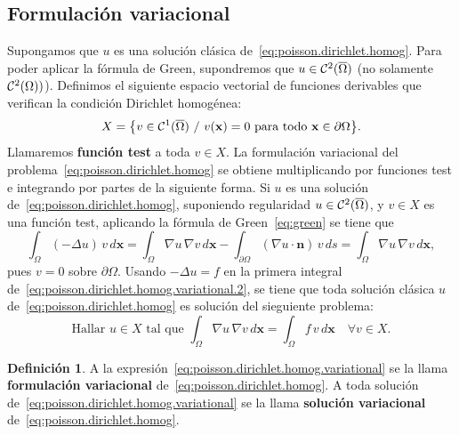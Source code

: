 \documentclass[11pt]{report}
\theoremstyle{plain}
\theoremstyle{definition}
\newtheorem{definition}[theorem]{Definición}
\newcommand{\xx}{\ensuremath{\mathbf{x}}\xspace}
\newcommand{\uu}{\ensuremath{u}\xspace}
\newcommand{\vv}{\ensuremath{v}\xspace}
\newcommand{\nn}{\ensuremath{\mathbf{n}}\xspace}
\newcommand{\tq}{\ /\ }
\newcommand{\classC}[2]{%
  \ensuremath{
   \ifthenelse{\equal{#2}{}}
    {\mathcal{C}^{#1}}
    {\mathcal{C}^{#1}(#2)}
  }
}
\begin{document}
\subsection{Formulación variacional}
 
Supongamos que $u$ es una solución clásica de~\eqref{eq:poisson.dirichlet.homog}. Para poder aplicar la fórmula de Green, supondremos que $u\in\classC2{\overline\Omega}$ (no solamente $\classC2\Omega)$). Definimos el siguiente espacio vectorial de funciones derivables que verifican la condición Dirichlet homogénea:
\begin{equation}
  \label{eq:poisson.dirichlet.homog.espacio.X}
  X=\big\{ 
    v\in\classC{1}{\overline\Omega} \tq v(\xx)=0 \text{ para todo } \xx\in\partial\Omega
  \big\}.
\end{equation}
Llamaremos \textbf{función test} a toda $v\in X$. La formulación variacional del problema~\eqref{eq:poisson.dirichlet.homog} se obtiene multiplicando por funciones test e integrando por partes de la siguiente forma. Si $\uu$ es una solución de~\eqref{eq:poisson.dirichlet.homog}, suponiendo regularidad $\uu\in\classC2{\overline\Omega}$, y $\vv\in X$ es una función test, aplicando la fórmula de Green~\eqref{eq:green} se tiene que
\begin{equation}
  \label{eq:poisson.dirichlet.homog.variational.2}
  \int_\Omega (-\Delta\uu)\,\vv \, d\xx = 
  \int_\Omega \nabla\uu\, \nabla\vv \, d\xx - 
  \int_{\partial\Omega} (\nabla\uu\cdot\nn)\,\vv \, ds = 
  \int_\Omega \nabla\uu\, \nabla\vv \, d\xx,
\end{equation}
pues $\vv=0$ sobre $\partial\Omega$. Usando $-\Delta\uu=f$ en la primera integral de~\eqref{eq:poisson.dirichlet.homog.variational.2}, se tiene que toda solución clásica $\uu$ de~\eqref{eq:poisson.dirichlet.homog} es solución del sieguiente problema:
\begin{equation}
  \label{eq:poisson.dirichlet.homog.variational}
  \text{Hallar } \uu \in X \text{ tal que } \int_\Omega\nabla\uu \, \nabla\vv \, d\xx = \int_\Omega f\, \vv \, d\xx \quad\forall\vv\in X. 
\end{equation}
\begin{definition}
  A la expresión~\eqref{eq:poisson.dirichlet.homog.variational} se la llama \textbf{formulación variacional} de~\eqref{eq:poisson.dirichlet.homog}. A toda solución de~\eqref{eq:poisson.dirichlet.homog.variational} se la llama \textbf{solución variacional} de~\eqref{eq:poisson.dirichlet.homog}.
\end{definition}
\end{document}
